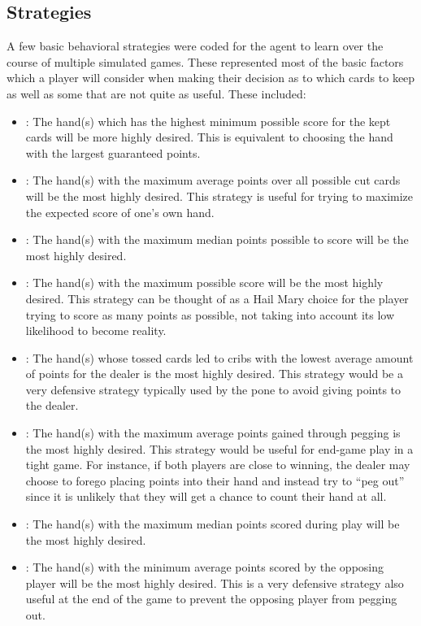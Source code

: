 
\subsection{Strategies}
\label{sec:dm-methods-strategies}


A few basic behavioral strategies were coded for the agent to learn
over the course of multiple simulated games.
%
These represented most of the basic factors which a player will consider when
making their decision as to which cards to keep
as well as some that are not quite as useful.
%
These included:
\begin{itemize}
\item \handmaxmin:
	The hand(s) which has the highest minimum possible score for the kept cards
	will be more highly desired.
	This is equivalent to choosing the hand with the largest guaranteed points.
\item \handmaxavg:
	The hand(s) with the maximum average points over all possible cut cards will
	be the most highly desired.
	This strategy is useful for trying to maximize the expected score of one's
	own hand.
\item \handmaxmed:
	The hand(s) with the maximum median points possible to score will be the most
	highly desired.
\item \handmaxposs:
	The hand(s) with the maximum possible score will be the most highly desired.
	This strategy can be thought of as a Hail Mary choice for the player trying
	to score as many points as possible, not taking into account its
	low likelihood to become reality.
\item \cribminavg:
	The hand(s) whose tossed cards led to cribs with the lowest average amount
	of points for the dealer is
	the most highly desired.
	This strategy would be a very defensive strategy typically used by the pone
	to avoid giving points to the dealer.
\item \peggingmaxavggained:
	The hand(s) with the maximum average points gained through pegging is the most
	highly desired.
	This strategy would be useful for end-game play in a tight game.
	For instance, if both players are close to winning, the dealer may
	choose to forego placing points into their hand and instead try to
		``peg out''
	since it is unlikely that they will get a chance to count their hand at all.
\item \peggingmaxmedgained:
	The hand(s) with the maximum median points scored during play will be the most
	highly desired.
\item \peggingminavggiven:
	The hand(s) with the minimum average points scored by the opposing player
	will be the most highly desired.
	This is a very defensive strategy also useful at the end of the game to
	prevent the opposing player from pegging out.
\end{itemize}
